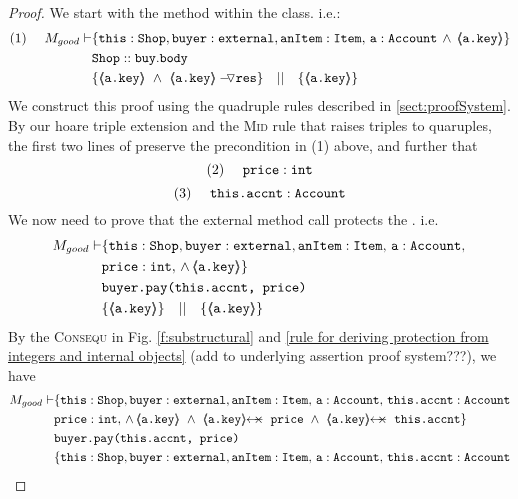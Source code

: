 \begin{proof}
We start with the  method within the  class. i.e.:
\small
\begin{align*}
\text{(1)}  \ \ \ \ M_{good} \vdash 
		&	\{  \prg{this}:\prg{Shop}, \prg{buyer} : \prg{external}, \prg{anItem} : \prg{Item},\, \prg{a}:\prg{Account}\,\wedge\, 
				{\inside{\prg{a.key}}} \} \\
		& \prg{Shop}::\prg{buy}.\prg{body}\ \\  
		& \{ {\inside{\prg{a.key}}}\ \wedge\ {\PushASLong {\prg{res}} {\inside{\prg{a.key}}}}  \} \ \ \  || \ \ \ 
		   \{ {\inside{\prg{a.key}}} \}
\end{align*}
\normalsize
We construct this proof using the quadruple rules described in \ref{sect:proofSystem}. By our hoare triple extension and the \textsc{Mid} rule that raises triples to quaruples, the first two lines
of \prg{buy} preserve the precondition in (1) above, and further that 
\small
$$
\text{(2)} \ \ \ \ \mbox{\normalfont{\texttt{price}}} : \mbox{\normalfont{\texttt{int}}}
$$ 
$$
\text{(3)} \ \ \ \ \prg{this.accnt} : \prg{Account}
$$ 
We now need to prove that the external method call  protects the . i.e.
\small
\begin{align*}
M_{good} \vdash & \{  \prg{this}:\prg{Shop}, \prg{buyer} : \prg{external}, \prg{anItem} : \prg{Item},\, \prg{a}:\prg{Account},\, \\
				& \prg{price} : \prg{int},\,
				  \wedge\, 
				  {\inside{\prg{a.key}}} \} \\
		  		& \prg{buyer.pay(this.accnt, price)}\ \\  
		  		& \{ {\inside{\prg{a.key}}}  \} \ \ \  || \ \ \ 
		  		   \{ {\inside{\prg{a.key}}} \}
\end{align*}
\normalsize
By the \textsc{Consequ} in Fig. \ref{f:substructural} and \ref{rule for deriving protection from integers and internal objects} (add to underlying assertion proof system???), we have
\small
\begin{align*}
M_{good} \vdash & \{  \prg{this}:\prg{Shop}, \prg{buyer} : \prg{external}, \prg{anItem} : \prg{Item},\, \prg{a}:\prg{Account},\, \prg{this.accnt}:\prg{Account}\\
				& \prg{price} : \prg{int},\,
				  \wedge\, 
				  {\inside{\prg{a.key}}}\ \wedge\ 
				  \protectedFrom{\prg{a.key}}{\prg{price}}\ \wedge\ 
				   \protectedFrom{\prg{a.key}}{\prg{this.accnt}}\} \\
		  		& \prg{buyer.pay(this.accnt, price)}\ \\  
		  		& \{  \prg{this}:\prg{Shop}, \prg{buyer} : \prg{external}, \prg{anItem} : \prg{Item},\, \prg{a}:\prg{Account},\, \prg{this.accnt}:\prg{Account}\\

\end{align*}
\end{proof}
